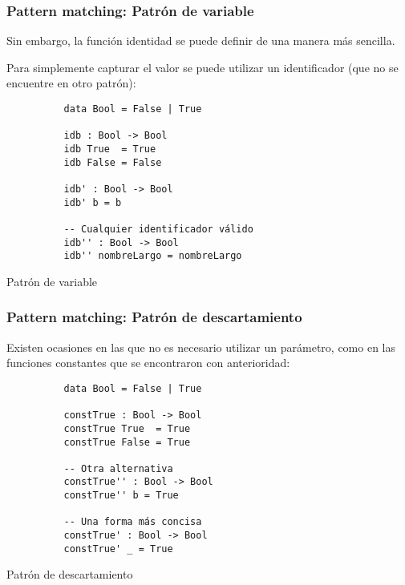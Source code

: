 \documentclass{beamer}
\begin{document}
\begin{frame}[fragile]
  \frametitle{Pattern matching: Patrón de variable}

  Sin embargo, la función identidad se puede definir de una manera más sencilla.

  Para simplemente capturar el valor se puede utilizar un identificador (que no se
  encuentre en otro patrón):


  \begin{listing}[H]
    \begin{center}
      \begin{minipage}{0.42\textwidth}
          \begin{verbatim}
          data Bool = False | True

          idb : Bool -> Bool
          idb True  = True
          idb False = False

          idb' : Bool -> Bool
          idb' b = b

          -- Cualquier identificador válido
          idb'' : Bool -> Bool
          idb'' nombreLargo = nombreLargo
          \end{verbatim}
      \end{minipage}
    \end{center}
    \caption{Patrón de variable}
    \label{lst:matchvariable}
  \end{listing}

\end{frame}

\begin{frame}[fragile]
  \frametitle{Pattern matching: Patrón de descartamiento}

  Existen ocasiones en las que no es necesario utilizar un parámetro, como
  en las funciones constantes que se encontraron con anterioridad:


  \begin{listing}[H]
    \begin{center}
      \begin{minipage}{0.42\textwidth}
          \begin{verbatim}
          data Bool = False | True

          constTrue : Bool -> Bool
          constTrue True  = True
          constTrue False = True

          -- Otra alternativa
          constTrue'' : Bool -> Bool
          constTrue'' b = True

          -- Una forma más concisa
          constTrue' : Bool -> Bool
          constTrue' _ = True
          \end{verbatim}
      \end{minipage}
    \end{center}
    \caption{Patrón de descartamiento}
    \label{lst:matchvariable}
  \end{listing}

\end{frame}
\end{document}
